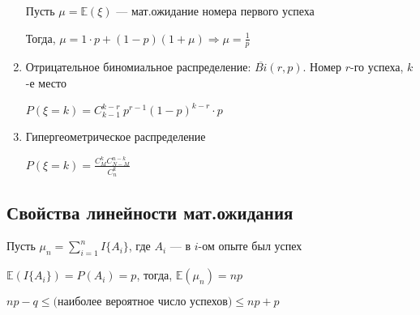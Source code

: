\documentclass[a4paper, 10pt]{article}
\begin{document}
\begin{enumerate}
     Пусть $\mu=\mathbb{E}(\xi)$ — мат.ожидание номера первого успеха
     
     Тогда, $\mu=1\cdot p+(1-p)(1+\mu)\Longrightarrow\mu=\frac{1}{p}$

     \item Отрицательное биномиальное распределение: $\overline{Bi}(r,p)$. Номер $r$-го успеха, $k$-е место

    $P(\xi=k)=C_{k-1}^{k-r}\ p^{r-1}(1-p)^{k-r}\cdot p$

    \item Гипергеометрическое распределение

    $P(\xi=k)=\displaystyle\frac{C_{M}^{k}C_{N-M}^{n-k}}{C_n^k}$
\end{enumerate}

\subsection{Свойства линейности мат.ожидания}
Пусть $\mu_n=\sum_{i=1}^{n}I\{A_i\}$, где $A_i$ — в $i$-ом опыте был успех

$\mathbb{E}(I\{A_i\})=P(A_i)=p$, тогда, $\mathbb{E}(\mu_n)=np$

$np-q\leqslant\text{(наиболее вероятное число успехов)}\leqslant np+p$
\end{document}
